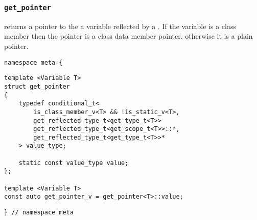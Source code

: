 
\subsubsection{\texttt{get\_pointer}}

returns a pointer to the a variable reflected by a .   If the variable is a class member then the pointer is a class data member pointer,   otherwise it is a plain pointer.

\begin{verbatim}
namespace meta {
\end{verbatim}
\begin{verbatim}
template <Variable T>
struct get_pointer
{
	typedef conditional_t<
		is_class_member_v<T> && !is_static_v<T>,
		get_reflected_type_t<get_type_t<T>>
		get_reflected_type_t<get_scope_t<T>>::*,
		get_reflected_type_t<get_type_t<T>>*
	> value_type;

	static const value_type value;
};
	
template <Variable T>
const auto get_pointer_v = get_pointer<T>::value;
\end{verbatim}
\begin{verbatim}
} // namespace meta
\end{verbatim}
